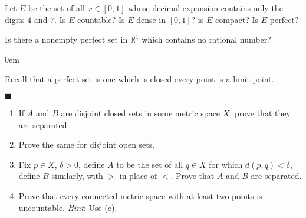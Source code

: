 \documentclass[12pt]{article}
\renewcommand{\qed}{\hfill$\blacksquare$}
\renewenvironment{proof}{\begin{addmargin}[1em]{0em}\begin{newproof}}{\end{newproof}\end{addmargin}\qed}
\newenvironment{problem}[2][Exercise]{\begin{trivlist}
\item[\hskip \labelsep {\bfseries #1}\hskip \labelsep {\bfseries #2.}]}{\end{trivlist}}
\begin{document}
\begin{problem}{2.17}
Let $E$ be the set of all $x\in\left[0,1\right]$ whose decimal expansion contains only the digits $4$ and $7$. Is $E$ countable? Is $E$ dense in $\left[0,1\right]$? is $E$ compact? Is $E$ perfect?
\end{problem}


\begin{problem}{2.18}
Is there a nonempty perfect set in $\mathbb{R}^1$ which contains no rational number?
\end{problem}
\begin{proof}
{\color{red}Recall that a perfect set is one which is closed every point is a limit point.} 
\end{proof}




\begin{problem}{2.19}
\begin{enumerate}[label=(\alph*)]
	\item If $A$ and $B$ are disjoint closed sets in some metric space $X$, prove that they are separated.
	\item Prove the same for disjoint open sets.
	\item Fix $p\in X$, $\delta > 0$, define $A$ to be the set of all $q\in X$ for which $d\left(p,q\right)<\delta$, define $B$ similarly, with $>$ in place of $<$. Prove that $A$ and $B$ are separated.
	\item Prove that every connected metric space with at least two points is uncountable. \textit{Hint}: Use (c).
\end{enumerate}
\end{problem}
\end{document}

